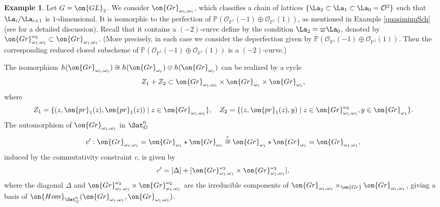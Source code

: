 \documentclass[11pt]{amsart}
\theoremstyle{definition}
\theoremstyle{definition}
\newtheorem{ex}[thm]{Example}
\theoremstyle{definition}
\numberwithin{equation}{subsection}
\newcommand{\bP}{{\mathbb P}}
\newcommand{\mO}{{\mathcal O}}
\newcommand{\Gr}{{\on{Gr}}}
\newcommand{\Hom}{{\on{Hom}}}
\newcommand{\pr}{{\on{pr}}}
\newcommand{\GL}{{\on{GL}}}
\begin{document}
\begin{ex}
\label{R: comm via cycle}
Let $G=\GL_2$.
We consider $\Gr_{\omega_1,\omega_1}$, which classifies a chain of lattices $\{\La_2\subset\La_1\subset\La_0=\mO^2\}$ such that $\La_i/\La_{i+1}$ is $1$-dimensional.  It is isomorphic to the perfection of $\bP(\mO_{\bP^1}(-1)\oplus\mO_{\bP^1}(1))$, as mentioned in Example \ref{quasiminuSch} (see \cite[\S B.3]{Zh1} for a detailed discussion). Recall that it contains a $(-2)$-curve define by the condition $\La_2=\varpi\La_0$, denoted by $\Gr_{\omega_1,\omega_1}^{\omega_2}\subset \Gr_{\omega_1,\omega_1}$. (More precisely, in each case we consider the deperfection given by  $\bP(\mO_{\bP^1}(-1)\oplus\mO_{\bP^1}(1))$. Then the corresponding reduced closed subscheme of $\bP(\mO_{\bP^1}(-1)\oplus\mO_{\bP^1}(1))$ is a $(-2)$-curve.)


The isomorphism $h(\Gr_{\omega_1,\omega_1})\cong h(\Gr_{\omega_1})\otimes h(\Gr_{\omega_1})$ can be realized by a cycle 
$$Z_1+Z_2\subset \Gr_{\omega_1,\omega_1}\times \Gr_{\omega_1}\times \Gr_{\omega_1},$$ 
where 
$$Z_1=\{(z,\pr_1(z),\pr_1(z))\mid z\in \Gr_{\omega_1,\omega_1}\}, \quad Z_2=\{ (z, \pr_1(z), y)\mid z\in \Gr_{\omega_1,\omega_1}^{\omega_2}, y\in \Gr_{\omega_1}\}.$$ 
The automorphism of $\Gr_{\omega_1,\omega_1}$ in $\Sat_G^0$ 
\[c':\Gr_{\omega_1,\omega_1}= \Gr_{\omega_1}\star \Gr_{\omega_1}\stackrel{c}{\cong} \Gr_{\omega_1}\star \Gr_{\omega_1}=\Gr_{\omega_1,\omega_1},\]
induced by the commutativity constraint $c$, is given by 
\begin{equation}
\label{E:comm via cycle}
c'=[\Delta]+[\Gr_{\omega_1,\omega_1}^{\omega_2}\times \Gr_{\omega_1,\omega_1}^{\omega_2}],
\end{equation}
where the diagonal $\Delta$ and $\Gr_{\omega_1,\omega_1}^{\omega_2}\times \Gr_{\omega_1,\omega_1}^{\omega_2}$ are the irreducible components of $\Gr_{\omega_1,\omega_1}\times_{\Gr}\Gr_{\omega_1,\omega_1}$, giving a basis of
$\Hom_{\Sat_G^{0}}(\Gr_{\omega_1,\omega_1},\Gr_{\omega_1,\omega_1})$.
\end{ex}
\end{document}
